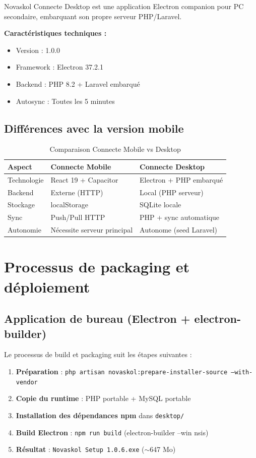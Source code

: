 \documentclass[12pt,a4paper,twoside]{report}
\begin{document}
Novaskol Connecte Desktop est une application Electron companion pour PC secondaire, embarquant son propre serveur PHP/Laravel.

\textbf{Caractéristiques techniques :}
\begin{itemize}
    \item Version : 1.0.0
    \item Framework : Electron 37.2.1
    \item Backend : PHP 8.2 + Laravel embarqué
    \item Autosync : Toutes les 5 minutes
\end{itemize}

\subsection{Différences avec la version mobile}

\begin{table}[h]
\centering
\caption{Comparaison Connecte Mobile vs Desktop}
\begin{tabular}{lll}
\toprule
Aspect & Connecte Mobile & Connecte Desktop \\
\midrule
Technologie & React 19 + Capacitor & Electron + PHP embarqué \\
Backend & Externe (HTTP) & Local (PHP serveur) \\
Stockage & localStorage & SQLite locale \\
Sync & Push/Pull HTTP & PHP + sync automatique \\
Autonomie & Nécessite serveur principal & Autonome (seed Laravel) \\
\bottomrule
\end{tabular}
\end{table}

\section{Processus de packaging et déploiement}

\subsection{Application de bureau (Electron + electron-builder)}

Le processus de build et packaging suit les étapes suivantes :
\begin{enumerate}
    \item \textbf{Préparation} : \texttt{php artisan novaskol:prepare-installer-source --with-vendor}
    \item \textbf{Copie du runtime} : PHP portable + MySQL portable
    \item \textbf{Installation des dépendances npm} dans \texttt{desktop/}
    \item \textbf{Build Electron} : \texttt{npm run build} (electron-builder --win nsis)
    \item \textbf{Résultat} : \texttt{Novaskol Setup 1.0.6.exe} ($\sim$647 Mo)
\end{enumerate}
\end{document}
